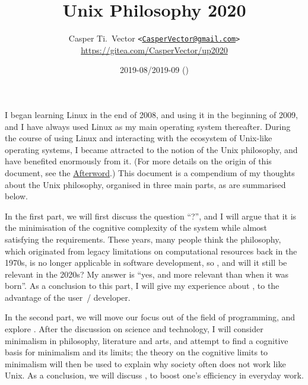 \documentclass{article}
\begin{document}
\title{\textbf{Unix Philosophy 2020}}
\author{%
	Casper Ti.\ Vector
	\texttt{<\url{CasperVector@gmail.com}>}\\
	\url{https://gitea.com/CasperVector/up2020}%
}
\date{2019-08/2019-09 (\docversion)}
\maketitle
\vspace{\baselineskip}
\tableofcontents


I began learning Linux in the end of 2008, and using it in the beginning of
2009, and I have always used Linux as my main operating system thereafter.
During the course of using Linux and interacting with the ecosystem of
Unix-like operating systems, I became attracted to the notion of the Unix
philosophy, and have benefited enormously from it.  (For more details on
the origin of this document, see the \hyperref[sec:afterword]{Afterword}.)
This document is a compendium of my thoughts about the Unix philosophy,
organised in three main parts, as are summarised below.

In the first part, we will first discuss the question ``?'', and I will argue that it is the minimisation
of the cognitive complexity of the system while almost satisfying the
requirements.  These years, many people think the philosophy, which originated
from legacy limitations on computational resources back in the 1970s, is no
longer applicable in software development, so , and will it still be relevant in the 2020s?  My answer is
``yes, and more relevant than when it was born''.  As a conclusion to this part,
I will give my experience about , to the advantage of the user~/ developer.

In the second part, we will move our focus out of the field of programming, and
explore .  After the discussion on
science and technology, I will consider minimalism in philosophy, literature
and arts, and attempt to find a cognitive basis for minimalism and its limits;
the theory on the cognitive limits to minimalism will then be used to explain
why society often does not work like Unix.  As a conclusion, we will discuss
,
to boost one's efficiency in everyday work.
\end{document}
